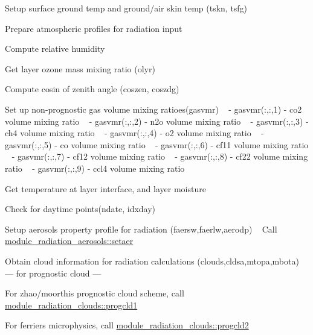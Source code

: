 \begin{DoxyEnumerate}
\item Setup surface ground temp and ground/air skin temp (tskn, tsfg)
\item Prepare atmospheric profiles for radiation input
\item Compute relative humidity
\item Get layer ozone mass mixing ratio (olyr)
\item Compute cosin of zenith angle (coszen, coszdg)
\item Set up non-\/prognostic gas volume mixing ratioes(gasvmr) ~\newline
 -\/ gasvmr(\+:,\+:,1) -\/ co2 volume mixing ratio ~\newline
 -\/ gasvmr(\+:,\+:,2) -\/ n2o volume mixing ratio ~\newline
 -\/ gasvmr(\+:,\+:,3) -\/ ch4 volume mixing ratio ~\newline
 -\/ gasvmr(\+:,\+:,4) -\/ o2 volume mixing ratio ~\newline
 -\/ gasvmr(\+:,\+:,5) -\/ co volume mixing ratio ~\newline
 -\/ gasvmr(\+:,\+:,6) -\/ cf11 volume mixing ratio ~\newline
 -\/ gasvmr(\+:,\+:,7) -\/ cf12 volume mixing ratio ~\newline
 -\/ gasvmr(\+:,\+:,8) -\/ cf22 volume mixing ratio ~\newline
 -\/ gasvmr(\+:,\+:,9) -\/ ccl4 volume mixing ratio
\item Get temperature at layer interface, and layer moisture
\item Check for daytime points(ndate, idxday)
\item Setup aerosols property profile for radiation (faersw,faerlw,aerodp) ~\newline
 Call \hyperlink{namespacemodule__radiation__aerosols_a94a9a162f822d2ee5c5bff611403dd06}{module\+\_\+radiation\+\_\+aerosols\+::setaer}
\item Obtain cloud information for radiation calculations (clouds,cldsa,mtopa,mbota) ~\newline
 --- for prognostic cloud ---
\begin{DoxyItemize}
\item For zhao/moorthi\textquotesingle{}s prognostic cloud scheme, call \hyperlink{namespacemodule__radiation__clouds_ab45374e1eeec7d6211284b38c3ec8448}{module\+\_\+radiation\+\_\+clouds\+::progcld1}
\item For ferrier\textquotesingle{}s microphysics, call \hyperlink{namespacemodule__radiation__clouds_a2f45f48505bb69a968c788ff680b5642}{module\+\_\+radiation\+\_\+clouds\+::progcld2}

\end{DoxyItemize}
\end{DoxyEnumerate}

